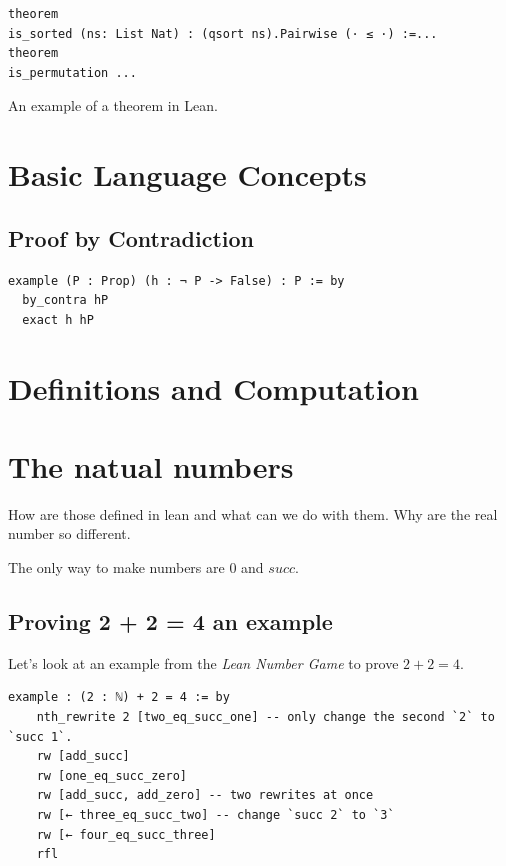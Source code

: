 \begin{lstlisting}[float=tbh, mathescape=true, captionpos=b, caption=Lean 4, label=beta, language=lean]
theorem 
is_sorted (ns: List Nat) : (qsort ns).Pairwise (· ≤ ·) :=...
theorem 
is_permutation ...
\end{lstlisting}
\label{qsort_validation}

An example of a theorem in Lean.


 

\section{Basic Language Concepts}

\subsection{Proof by Contradiction}

\begin{lstlisting}[float=tbh, mathescape=true, captionpos=b, caption=Proof by contradiction, label=contradiction, language=lean]
example (P : Prop) (h : ¬ P -> False) : P := by
  by_contra hP 
  exact h hP        
\end{lstlisting}



\section{Definitions and Computation}

\section{The natual numbers}
How are those defined in lean and what can we do with them. Why are the real number so different.



The only way to make numbers are $0$ and $succ$.

\subsection{Proving 2 + 2 = 4 an example}
Let's look at an example from the \textit{Lean Number Game} to prove $2+2=4$.

\begin{lstlisting}[float=tbh, mathescape=true, captionpos=b, caption=Proof by contradiction, label=contradiction, language=lean]
example : (2 : ℕ) + 2 = 4 := by
    nth_rewrite 2 [two_eq_succ_one] -- only change the second `2` to `succ 1`.
    rw [add_succ]
    rw [one_eq_succ_zero]
    rw [add_succ, add_zero] -- two rewrites at once
    rw [← three_eq_succ_two] -- change `succ 2` to `3`
    rw [← four_eq_succ_three]
    rfl
\end{lstlisting}


